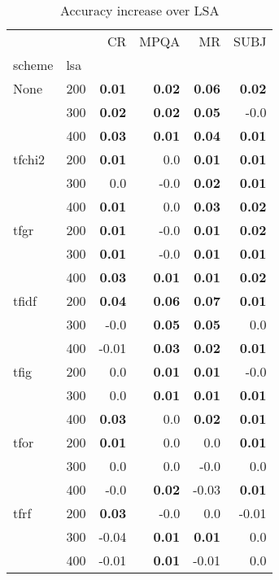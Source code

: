 
\begin{table}[H]
\begin{center}

\begin{tabular}{ll|rrrr}
\toprule
   &   &   CR &  MPQA &   MR &  SUBJ \\
scheme & lsa &        &        &        &        \\
\midrule
None & 200 & \textbf{0.01} & \textbf{0.02} & \textbf{0.06} & \textbf{0.02} \\
   & 300 & \textbf{0.02} & \textbf{0.02} & \textbf{0.05} &     -0.0 \\
   & 400 & \textbf{0.03} & \textbf{0.01} & \textbf{0.04} & \textbf{0.01} \\
tfchi2 & 200 & \textbf{0.01} &      0.0 & \textbf{0.01} & \textbf{0.01} \\
   & 300 &      0.0 &     -0.0 & \textbf{0.02} & \textbf{0.01} \\
   & 400 & \textbf{0.01} &      0.0 & \textbf{0.03} & \textbf{0.02} \\
tfgr & 200 & \textbf{0.01} &     -0.0 & \textbf{0.01} & \textbf{0.02} \\
   & 300 & \textbf{0.01} &     -0.0 & \textbf{0.01} & \textbf{0.01} \\
   & 400 & \textbf{0.03} & \textbf{0.01} & \textbf{0.01} & \textbf{0.02} \\
tfidf & 200 & \textbf{0.04} & \textbf{0.06} & \textbf{0.07} & \textbf{0.01} \\
   & 300 &     -0.0 & \textbf{0.05} & \textbf{0.05} &      0.0 \\
   & 400 &     -0.01 & \textbf{0.03} & \textbf{0.02} & \textbf{0.01} \\
tfig & 200 &      0.0 & \textbf{0.01} & \textbf{0.01} &     -0.0 \\
   & 300 &      0.0 & \textbf{0.01} & \textbf{0.01} & \textbf{0.01} \\
   & 400 & \textbf{0.03} &      0.0 & \textbf{0.02} & \textbf{0.01} \\
tfor & 200 & \textbf{0.01} &      0.0 &      0.0 & \textbf{0.01} \\
   & 300 &      0.0 &      0.0 &     -0.0 &      0.0 \\
   & 400 &     -0.0 & \textbf{0.02} &     -0.03 & \textbf{0.01} \\
tfrf & 200 & \textbf{0.03} &     -0.0 &      0.0 &     -0.01 \\
   & 300 &     -0.04 & \textbf{0.01} & \textbf{0.01} &      0.0 \\
   & 400 &     -0.01 & \textbf{0.01} &     -0.01 &      0.0 \\
\bottomrule
\end{tabular}

\caption[Accuracy increase over LSA]{Accuracy increase over LSA}
\label{tab:batch:results}
\end{center}
\end{table}






